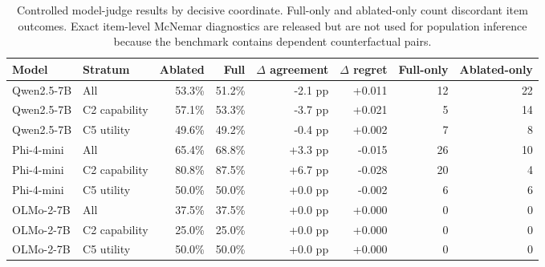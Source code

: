 \begin{table}[t]
\centering\small
\setlength{\tabcolsep}{5pt}
\begin{tabular}{llrrrrrr}
\toprule
Model & Stratum & Ablated & Full & $\Delta$ agreement & $\Delta$ regret & Full-only & Ablated-only \\
\midrule
Qwen2.5-7B & All & 53.3\% & 51.2\% & -2.1 pp & +0.011 & 12 & 22 \\
Qwen2.5-7B & C2 capability & 57.1\% & 53.3\% & -3.7 pp & +0.021 & 5 & 14 \\
Qwen2.5-7B & C5 utility & 49.6\% & 49.2\% & -0.4 pp & +0.002 & 7 & 8 \\
\addlinespace
Phi-4-mini & All & 65.4\% & 68.8\% & +3.3 pp & -0.015 & 26 & 10 \\
Phi-4-mini & C2 capability & 80.8\% & 87.5\% & +6.7 pp & -0.028 & 20 & 4 \\
Phi-4-mini & C5 utility & 50.0\% & 50.0\% & +0.0 pp & -0.002 & 6 & 6 \\
\addlinespace
OLMo-2-7B & All & 37.5\% & 37.5\% & +0.0 pp & +0.000 & 0 & 0 \\
OLMo-2-7B & C2 capability & 25.0\% & 25.0\% & +0.0 pp & +0.000 & 0 & 0 \\
OLMo-2-7B & C5 utility & 50.0\% & 50.0\% & +0.0 pp & +0.000 & 0 & 0 \\
\bottomrule
\end{tabular}
\caption{Controlled model-judge results by decisive coordinate. Full-only and ablated-only count discordant item outcomes. Exact item-level McNemar diagnostics are released but are not used for population inference because the benchmark contains dependent counterfactual pairs.}
\label{tab:controlled-model-judges-strata}
\end{table}
